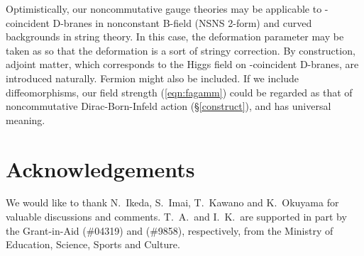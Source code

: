 \documentclass[10pt,a4paper]{article}
\def\h{\hbar}
\begin{document}
Optimistically, our noncommutative gauge theories may be applicable to \coordHE{}-coincident D\coordHE{}-branes in nonconstant B-field (NSNS 2-form) and curved backgrounds in string theory. In this case, the deformation parameter \myHighlight{$\h$}\coordHE{} may be taken as \coordHE{} so that the deformation is a sort of stringy correction. By construction, \coordHE{} adjoint matter, which corresponds to the Higgs field on \coordHE{}-coincident D-branes, are introduced naturally. Fermion might also be included. If we include diffeomorphisms, our field strength (\ref{eqn:fagamm}) could be regarded as that of noncommutative Dirac-Born-Infeld action (\S\ref{construct}), and has universal meaning. 

\section*{Acknowledgements}
We would like to thank N.~Ikeda, S.~Imai, T.~Kawano and K.~Okuyama for valuable discussions and comments. 
T.~A.\ and I.~K.\ are supported in part by the Grant-in-Aid (\#04319) and (\#9858), respectively, from the Ministry of Education, Science, Sports and Culture.

\appendix
\end{document}
